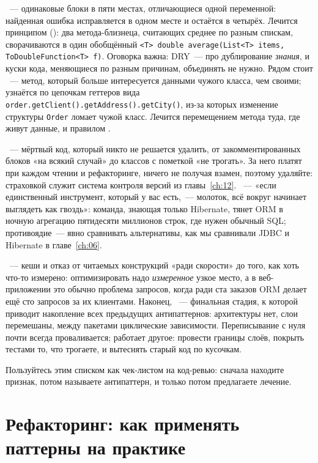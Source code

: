 ~--- одинаковые блоки в пяти местах, отличающиеся
одной переменной: найденная ошибка исправляется в одном месте и остаётся в
четырёх. Лечится принципом  (): два
метода-близнеца, считающих среднее по разным спискам, сворачиваются в один
обобщённый \texttt{<T> double average(List<T> items, ToDoubleFunction<T> f)}.
Оговорка важна: DRY~--- про дублирование \emph{знания}, и куски кода, меняющиеся
по разным причинам, объединять не нужно. Рядом стоит ~---
метод, который больше интересуется данными чужого класса, чем своими; узнаётся
по цепочкам геттеров вида \texttt{order.getClient().getAddress().getCity()},
из-за которых изменение структуры \texttt{Order} ломает чужой класс. Лечится
перемещением метода туда, где живут данные, и правилом .

~--- мёртвый код, который никто не решается удалить, от
закомментированных блоков «на всякий случай» до классов с пометкой «не трогать».
За него платят при каждом чтении и рефакторинге, ничего не получая взамен,
поэтому удаляйте: страховкой служит система контроля версий из
главы~\ref{ch:12}. ~--- «если единственный инструмент,
который у вас есть,~--- молоток, всё вокруг начинает выглядеть как гвоздь»:
команда, знающая только Hibernate, тянет ORM в ночную агрегацию пятидесяти
миллионов строк, где нужен обычный SQL; противоядие~--- явно сравнивать
альтернативы, как мы сравнивали JDBC и Hibernate в главе~\ref{ch:06}.

~--- кеши и отказ от читаемых конструкций «ради
скорости» до того, как хоть что-то измерено: оптимизировать надо
\emph{измеренное} узкое место, а в веб-приложении это обычно проблема 
запросов, когда ради ста заказов ORM делает ещё сто запросов за их клиентами.
Наконец, ~--- финальная стадия, к которой приводит
накопление всех предыдущих антипаттернов: архитектуры нет, слои перемешаны,
между пакетами циклические зависимости. Переписывание с нуля почти всегда
проваливается; работает другое: провести границы слоёв, покрыть тестами то, что
трогаете, и вытеснять старый код по кусочкам.

Пользуйтесь этим списком как чек-листом на код-ревью: сначала находите признак,
потом называете антипаттерн, и только потом предлагаете лечение.

\section{Рефакторинг: как применять паттерны на практике}

